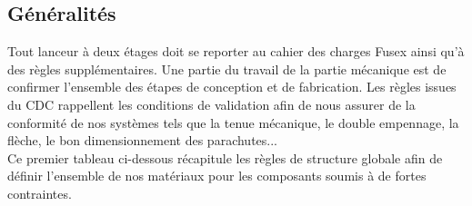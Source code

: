 \subsection{Généralités}
\label{subsec:generalites}

Tout lanceur à deux étages doit se reporter au cahier des charges \gls{Fusex} ainsi qu'à des règles supplémentaires. Une partie
du travail de la partie mécanique est de confirmer l'ensemble des étapes de conception et de fabrication. Les règles issues du
\acrshort{CDC} rappellent les conditions de validation afin de nous assurer de la conformité de nos systèmes tels que la tenue
mécanique, le double empennage, la flèche, le bon dimensionnement des parachutes... \\

Ce premier tableau ci-dessous récapitule les règles de structure globale afin de définir l'ensemble de nos matériaux pour les
composants soumis à de fortes contraintes.

